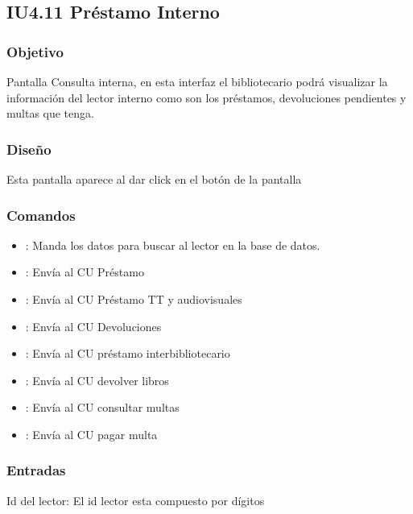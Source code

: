 \newpage
\subsection{IU4.11 Préstamo Interno}

\subsubsection{Objetivo}
	Pantalla Consulta interna, en esta interfaz el bibliotecario podrá visualizar la información del lector interno como son los préstamos, devoluciones pendientes y  multas que tenga.

\subsubsection{Diseño}
	Esta pantalla aparece al dar click en el botón  de la pantalla  


\subsubsection{Comandos}
	\begin{itemize}
		\item {}: Manda los datos para buscar al lector en la base de datos.
		\item {}: Envía al CU Préstamo
		\item {}: Envía al CU Préstamo TT y audiovisuales
		\item {}: Envía al CU Devoluciones
		\item {}: Envía al CU préstamo interbibliotecario
		\item {}: Envía al CU devolver libros
		\item {}: Envía al CU consultar multas
		\item {}: Envía al CU pagar multa
	\end{itemize}	

\subsubsection{Entradas}
	\begin{Citemize}
		\item Id del lector: El id lector esta compuesto por dígitos
	\end{Citemize}
